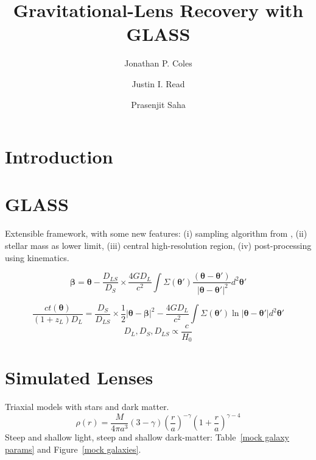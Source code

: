 \documentclass[usenatbib,onecolumn,galley]{mn2e}
\title{Gravitational-Lens Recovery with GLASS}
\author{%
Jonathan P. Coles 
\and 
Justin I. Read
\and 
Prasenjit Saha 
}
\newcommand{\tabref}[1] {Table~\ref{#1}}
\newcommand{\figref}[1] {Figure~\ref{#1}}
\renewcommand{\vec}[1]{\ensuremath{\boldsymbol{#1}}}
\begin{document}
\maketitle

\begin{abstract}
\end{abstract}

\section{Introduction}

\section{GLASS}

Extensible framework, with some new features: (i) sampling algorithm
from \cite{2012MNRAS.425.3077L}, (ii) stellar mass as lower limit,
(iii) central high-resolution region, (iv) post-processing using
kinematics.

\begin{equation}
\vec\beta = \vec\theta - \frac{D_{LS}}{D_S} \times \frac{4GD_L}{c^2}
\int \Sigma(\vec\theta')
\frac{(\vec\theta - \vec\theta')}{\ |\vec\theta - \vec\theta'|^2}
d^2\vec\theta'
\label{lensing equation}
\end{equation}

\begin{equation}
\frac{ct(\vec\theta)}{(1+z_L)D_{L}} =
\frac{D_{S}}{D_{LS}} \times {\textstyle\frac12} |\vec\theta - \vec\beta|^2
- \frac{4GD_{L}}{c^2}
\int \Sigma(\vec\theta') \ln |\vec\theta-\vec\theta'| d^2\vec\theta'
\label{full arrival time}
\end{equation}
\begin{equation}
D_L, D_S, D_{LS} \propto \frac c{H_0}
\end{equation}

\section{Simulated Lenses}

Triaxial models with stars and dark matter.
\begin{equation}
\rho(r) = \frac{M}{4\pi a^3}(3-\gamma)
\left(\frac ra\right)^{-\gamma}\left(1 + \frac ra\right)^{\gamma-4}
\label{Dehnen profile}
\end{equation}
Steep and shallow light, steep and shallow dark-matter: \tabref{mock
  galaxy params} and \figref{mock galaxies}.
\end{document}
